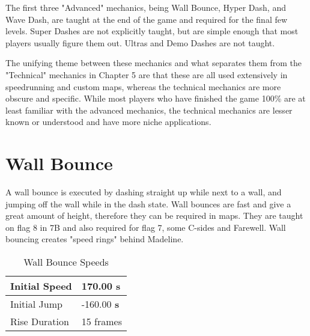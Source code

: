 \documentclass[oneside]{book}
\newcommand{\s}{\textbf{s}}
\begin{document}
The first three "Advanced" mechanics, being Wall Bounce, Hyper Dash, and Wave Dash, are taught at the end of the game and required for the final few levels. Super Dashes are not explicitly taught, but are simple enough that most players usually figure them out. Ultras and Demo Dashes are not taught.

The unifying theme between these mechanics and what separates them from the "Technical" mechanics in Chapter 5 are that these are all used extensively in speedrunning and custom maps, whereas the technical mechanics are more obscure and specific. While most players who have finished the game 100\% are at least familiar with the advanced mechanics, the technical mechanics are lesser known or understood and have more niche applications.

\section{Wall Bounce}

A wall bounce is executed by dashing straight up while next to a wall, and jumping off the wall while in the dash state. Wall bounces are fast and give a great amount of height, therefore they can be required in maps. They are taught on flag 8 in 7B and also required for flag 7, some C-sides and Farewell. Wall bouncing creates "speed rings" behind Madeline.

\begin{table}[h]
\begin{tabular}{|l|l|}
\hline
Initial Speed&170.00 \s\\
\hline
Initial Jump&-160.00 \s\\
\hline
Rise Duration&15 frames\\
\hline
\end{tabular} 
\caption{Wall Bounce Speeds}
\end{table}

\begin{comment}
\begin{table}[h]
\begin{tabular}{|l|l|}
\hline
Frames&Vertical Speed\\
\hline
1-15&-160.00 \s\\
\hline
16-23&+15.00 \s/f (to -40.00)\\
\hline
24-34&+7.50 \s/f (to +42.50)\\
\hline
35-41&+15.00 \s/f (to +147.50)\\
\hline
42-&+160.00 \s\\
\hline
Horizontal Speed&170.00\\
\hline
\end{tabular} 
\caption{Wall Bounce Sequence}
\end{table}
\end{comment}
\end{document}
